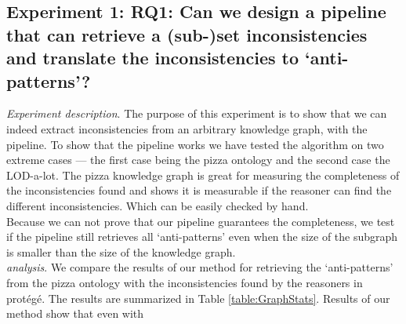 \documentclass{article}
\begin{document}
\subsection{Experiment 1: \textbf{RQ1}:  Can we design a pipeline that can retrieve a (sub-)set inconsistencies and translate the inconsistencies to `anti-patterns'?}
\textit{Experiment description}. The purpose of this experiment is to show that we can indeed extract inconsistencies from an arbitrary knowledge graph, with the pipeline. 
To show that the pipeline works we have tested the algorithm on two extreme cases — the first case being the pizza ontology and the second case the LOD-a-lot.
The pizza knowledge graph is great for measuring the completeness of the inconsistencies found and shows it is measurable if the reasoner can find the different inconsistencies. Which can be easily checked by hand.\\
Because we can not prove that our pipeline guarantees the completeness, we test if the pipeline still retrieves all `anti-patterns' even when the size of the subgraph is 
smaller than the size of the knowledge graph.\\
\textit{analysis}. We compare the results of our method for retrieving the `anti-patterns' from the pizza ontology with the inconsistencies found by the reasoners in prot\'{e}g\'{e}.
The results are summarized in Table \ref{table:GraphStats}. Results of our method show that even with 

\begin{table}[!t]
	\centering
	\caption{table showing the reasoners to test the pizza ontology.}
	\label{table:PizzaOntology}
\end{table}
\end{document}
